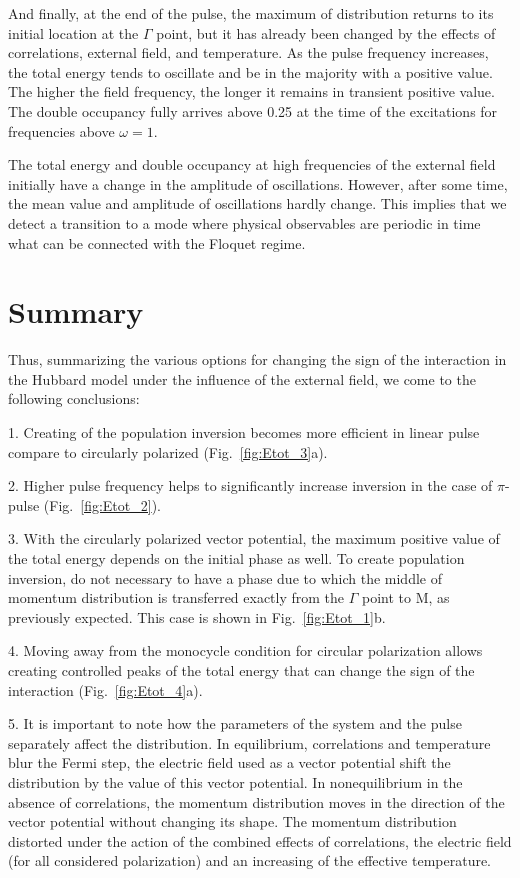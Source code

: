 And finally, at the end of the pulse, the maximum of distribution returns to its initial location at the $\Gamma$ point, but it has already been changed by the effects of correlations, external field, and temperature.
As the pulse frequency increases, the total energy tends to oscillate and be in the majority with a positive value. The higher the field frequency, the longer it remains in transient positive value. The double occupancy fully arrives above 0.25 at the time of the excitations for frequencies above $\omega=1$. 

The total energy and double occupancy at high frequencies of the external field initially have a change in the amplitude of oscillations. However, after some time, the mean value and amplitude of oscillations hardly change. This implies that we detect a transition to a mode where physical observables are periodic in time what can be connected with the Floquet regime.

\FloatBarrier
\section{Summary}
Thus, summarizing the various options for changing the sign of the interaction in the Hubbard model under the influence of the external field, we come to the following conclusions:

1. Creating of the population inversion becomes more efficient in linear pulse compare to circularly polarized (Fig.~\ref{fig:Etot_3}a).

2. Higher pulse frequency helps to significantly increase inversion in the case of $\pi$-pulse (Fig.~\ref{fig:Etot_2}).

3. With the circularly polarized vector potential, the maximum positive value of the total energy depends on the initial phase as well. To create population inversion, do not necessary to have a phase due to which the middle of momentum distribution is transferred exactly from the $\Gamma$ point to M, as previously expected. This case is shown in Fig.~\ref{fig:Etot_1}b.

4. Moving away from the monocycle condition for circular polarization allows creating controlled peaks of the total energy that can change the sign of the interaction (Fig.~\ref{fig:Etot_4}a).

5. It is important to note how the parameters of the system and the pulse separately affect the distribution. In equilibrium, correlations and temperature blur the Fermi step, the electric field used as a vector potential shift the distribution by the value of this vector potential. In nonequilibrium in the absence of correlations, the momentum distribution moves in the direction of the vector potential without changing its shape. 
The momentum distribution distorted under the action of the combined effects of correlations, the electric field (for all considered polarization) and an increasing of the effective temperature.